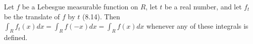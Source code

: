 Let $f$ be a Lebesgue measurable function on $R$, let $t$ be a real number, and let $f_t$ be the translate of $f$ by $t$ (8.14). Then $\int_R f_t(x) dx = \int_R f(-x) dx = \int_R f(x) dx$ whenever any of these integrals is defined.
